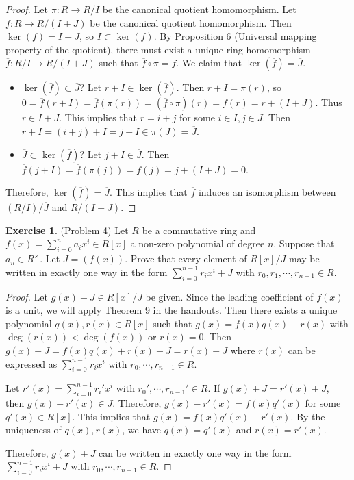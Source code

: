 \documentclass[12pt, psamsfonts]{amsart}
\theoremstyle{definition}
\newtheorem*{exer}{Exercise}
\theoremstyle{remark}
\numberwithin{equation}{section}
\begin{document}
\begin{proof}
  Let $\pi: R \rightarrow R / I$ be the canonical quotient homomorphism.
  Let $f: R \rightarrow R / (I + J)$ be the canonical quotient homomorphism.
  Then $\ker(f) = I + J$, so $I \subset \ker(f)$.
  By Proposition 6 (Universal mapping property of the quotient), there must exist a unique ring homomorphism $\overline{f}: R / I \rightarrow R / (I + J)$ such that $\overline{f} \circ \pi = f$.
  We claim that $\ker(\overline{f}) = \overline{J}$.
  \begin{itemize}
    \item
      $\ker(\overline{f}) \subset \overline{J}$?
      Let $r + I \in \ker(\overline{f})$.
      Then $r + I = \pi(r)$, so $0 = \overline{f}(r + I) = \overline{f}(\pi(r)) = (\overline{f} \circ \pi)(r) = f(r) = r + (I + J)$.
      Thus $r \in I + J$.
      This implies that $r = i + j$ for some $i \in I, j \in J$.
      Then $r + I = (i + j) + I = j + I \in \pi(J) = \overline{J}$.
    \item
      $\overline{J} \subset \ker(\overline{f})$?
      Let $j + I \in \overline{J}$.
      Then $\overline{f}(j + I) = \overline{f}(\pi(j)) = f(j) = j + (I + J) = 0$.
  \end{itemize}
  Therefore, $\ker(\overline{f}) = \overline{J}$.
  This implies that $\overline{f}$ induces an isomorphism between $(R / I) / \overline{J}$ and $R / (I + J)$.
\end{proof}

\begin{exer}{(Problem 4)}
  Let $R$ be a commutative ring and $f(x) = \sum_{i=0}^{n} a_ix^i \in R[x]$ a non-zero polynomial of degree $n$.
  Suppose that $a_n \in R^{\times}$.
  Let $J = (f(x))$.
  Prove that every element of $R[x]/J$ may be written in exactly one way in the form $\sum_{i=0}^{n - 1}r_ix^i + J$ with $r_0, r_1, \cdots, r_{n - 1} \in R$.
\end{exer}

\begin{proof}
  Let $g(x) + J \in R[x] / J$ be given.
  Since the leading coefficient of $f(x)$ is a unit, we will apply Theorem 9 in the handouts.
  Then there exists a unique polynomial $q(x), r(x) \in R[x]$ such that $g(x) = f(x)q(x) + r(x)$ with $\deg(r(x)) < \deg(f(x))$ or $r(x) = 0$.
  Then $g(x) + J = f(x)q(x) + r(x) + J = r(x) + J$ where $r(x)$ can be expressed as $\sum_{i = 0}^{n - 1} r_ix^i$ with $r_0, \cdots, r_{n - 1} \in R$.

  Let $r'(x) = \sum_{i = 0}^{n - 1} r_i'x^i$ with $r_0', \cdots, r_{n - 1}' \in R$.
  If $g(x) + J = r'(x) + J$, then $g(x) - r'(x) \in J$.
  Therefore, $g(x) - r'(x) = f(x)q'(x)$ for some $q'(x) \in R[x]$.
  This implies that $g(x) = f(x)q'(x) + r'(x)$.
  By the uniqueness of $q(x), r(x)$, we have $q(x) = q'(x)$ and $r(x) = r'(x)$.

  Therefore, $g(x) + J$ can be written in exactly one way in the form $\sum_{i = 0}^{n - 1} r_ix^i + J$ with $r_0, \cdots, r_{n - 1} \in R$.
\end{proof}
\end{document}
